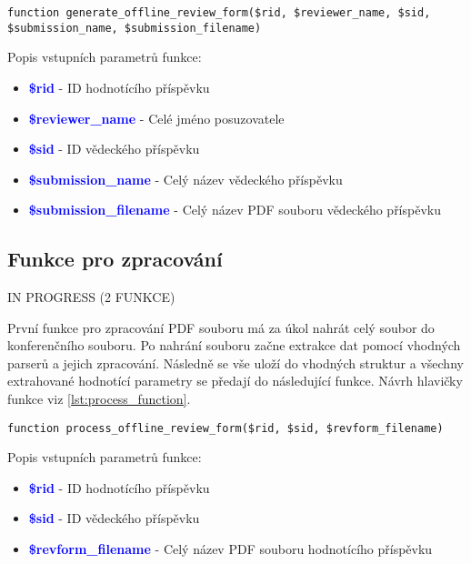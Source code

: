 \lstset{style=phpstyle}
\begin{lstlisting}[caption = {Návrh hlavičky funkce pro generování PDF souboru}, label = {lst:generate_function}, captionpos=b]
function generate_offline_review_form($rid, $reviewer_name, $sid, $submission_name, $submission_filename)
\end{lstlisting}
Popis vstupních parametrů funkce:
\begin{itemize}
	\item\textcolor{blue}{\textbf{\$rid}} - ID hodnotícího příspěvku
	\item\textcolor{blue}{\textbf{\$reviewer\_name}} - Celé jméno posuzovatele
	\item\textcolor{blue}{\textbf{\$sid}} - ID vědeckého příspěvku
	\item\textcolor{blue}{\textbf{\$submission\_name}} - Celý název vědeckého příspěvku
	\item\textcolor{blue}{\textbf{\$submission\_filename}} - Celý název PDF souboru vědeckého příspěvku
\end{itemize}

\subsection{Funkce pro zpracování}
IN PROGRESS (2 FUNKCE)
\par
První funkce pro zpracování PDF souboru má za úkol nahrát celý soubor do konferenčního souboru. Po nahrání souboru začne extrakce dat pomocí vhodných parserů a jejich zpracování. Následně se vše uloží do vhodných struktur a všechny extrahované hodnotící parametry se předají do následující funkce. Návrh hlavičky funkce viz \ref{lst:process_function}.

\begin{lstlisting}[caption = {Návrh hlavičky funkce pro extrakci dat}, label = {lst:process_function}, captionpos=b]
function process_offline_review_form($rid, $sid, $revform_filename)
\end{lstlisting}
Popis vstupních parametrů funkce:
\begin{itemize}
	\item\textcolor{blue}{\textbf{\$rid}} - ID hodnotícího příspěvku
	\item\textcolor{blue}{\textbf{\$sid}} - ID vědeckého příspěvku
	\item\textcolor{blue}{\textbf{\$revform\_filename}} - Celý název PDF souboru hodnotícího příspěvku
\end{itemize}

